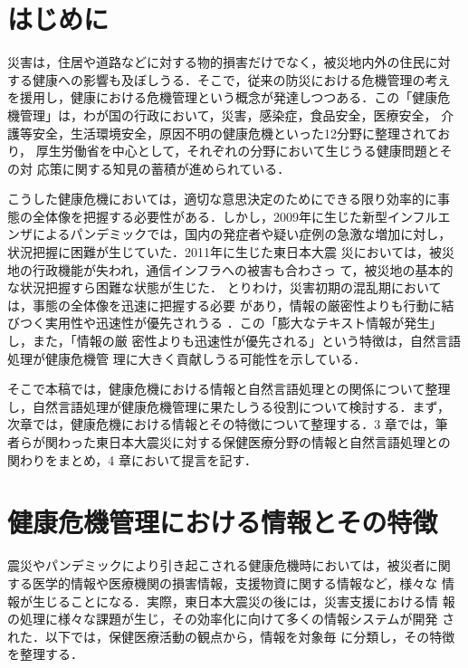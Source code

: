 \documentclass[japanese]{jnlp_1.4}
\begin{document}
\maketitle


\section{はじめに}

災害は，住居や道路などに対する物的損害だけでなく，被災地内外の住民に対
する健康への影響も及ぼしうる．そこで，従来の防災における危機管理の考え
を援用し，健康における危機管理という概念が発達しつつある．この「健康危
  機管理」は，わが国の行政において，災害，感染症，食品安全，医療安全，
介護等安全，生活環境安全，原因不明の健康危機といった12分野に整理されており，
厚生労働省を中心として，それぞれの分野において生じうる健康問題とその対
応策に関する知見の蓄積が進められている\cite{tanihata2012}．

こうした健康危機においては，適切な意思決定のためにできる限り効率的に事
態の全体像を把握する必要性がある．しかし，2009年に生じた新型インフルエ
ンザによるパンデミックでは，国内の発症者や疑い症例の急激な増加に対し，
状況把握に困難が生じていた\cite{okumura2009}．2011年に生じた東日本大震
災においては，被災地の行政機能が失われ，通信インフラへの被害も合わさっ
て，被災地の基本的な状況把握すら困難な状態が生じた\cite{shinsai2012}．
とりわけ，災害初期の混乱期においては，事態の全体像を迅速に把握する必要
があり，情報の厳密性よりも行動に結びつく実用性や迅速性が優先されうる
\cite{kunii2012}．この「膨大なテキスト情報が発生」し，また，「情報の厳
  密性よりも迅速性が優先される」という特徴は，自然言語処理が健康危機管
理に大きく貢献しうる可能性を示している．

そこで本稿では，健康危機における情報と自然言語処理との関係について整理
し，自然言語処理が健康危機管理に果たしうる役割について検討する．まず，
次章では，健康危機における情報とその特徴について整理する．3 章では，筆
者らが関わった東日本大震災に対する保健医療分野の情報と自然言語処理との
関わりをまとめ，4 章において提言を記す．


\section{健康危機管理における情報とその特徴}

震災やパンデミックにより引き起こされる健康危機時においては，被災者に関
する医学的情報や医療機関の損害情報，支援物資に関する情報など，様々な
情報が生じることになる．実際，東日本大震災の後には，災害支援における情
報の処理に様々な課題が生じ，その効率化に向けて多くの情報システムが開発
された\cite{utani2011}．以下では，保健医療活動の観点から，情報を対象毎
に分類し，その特徴を整理する．
\end{document}
